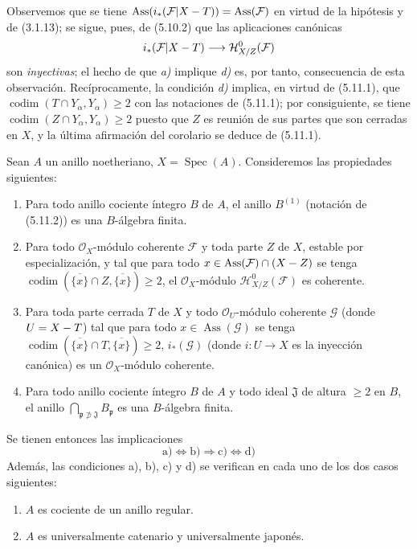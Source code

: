 Observemos que se tiene
$\operatorname{Ass}(i_*(\mathcal F\vert X- T))=\operatorname{Ass}(\mathcal F)$
en virtud de la hipótesis y de (3.1.13); se sigue, pues, de (5.10.2) que las
aplicaciones canónicas
\[
i_*(\mathcal F\vert X- T)\longrightarrow\mathcal H^0_{X/Z}(\mathcal F)
\]
son \emph{inyectivas}; el hecho de que \emph{a)} implique \emph{d)} es, por tanto, consecuencia de
esta observación. Recíprocamente, la condición \emph{d)} implica, en virtud de
(5.11.1), que $\operatorname{codim}(T\cap Y_\alpha,Y_\alpha)\geq2$ con las
notaciones de (5.11.1); por consiguiente, se tiene
$\operatorname{codim}(Z\cap Y_\alpha,Y_\alpha)\geq2$ puesto que $Z$ es reunión
de sus partes que son cerradas en $X$, y la última afirmación del
corolario se deduce de (5.11.1).

\begin{corollary}[5.11.6]
\label{IV.2.s5.11.6-fr}
Sean $A$ un anillo noetheriano, $X=\operatorname{Spec}(A)$. Consideremos las
propiedades siguientes:
\begin{enumerate}
\item[\textup{a)}] Para todo anillo cociente íntegro $B$ de $A$, el anillo $B^{(1)}$
\textup{(notación de (5.11.2))} es una $B$-álgebra finita.
\item[\textup{b)}] Para todo $\mathcal O_X$-módulo coherente $\mathcal F$ y toda parte
$Z$ de $X$, estable por especialización, y tal que para todo
$x\in\operatorname{Ass}(\mathcal F)\cap(X- Z)$ se tenga
$\operatorname{codim}(\overline{\{x\}}\cap Z,\overline{\{x\}})\geq2$, el
$\mathcal O_X$-módulo $\mathcal H^0_{X/Z}(\mathcal F)$ es coherente.
\item[\textup{c)}] Para toda parte cerrada $T$ de $X$ y todo $\mathcal O_U$-módulo
coherente $\mathcal G$ (donde $U=X- T$) tal que para todo
$x\in\operatorname{Ass}(\mathcal G)$ se tenga
$\operatorname{codim}(\overline{\{x\}}\cap T,\overline{\{x\}})\geq2$,
$i_*(\mathcal G)$ (donde $i:U\to X$ es la inyección canónica) es un
$\mathcal O_X$-módulo coherente.
\item[\textup{d)}] Para todo anillo cociente íntegro $B$ de $A$ y todo ideal
$\mathfrak J$ de altura $\geq2$ en $B$, el anillo
$\bigcap_{\mathfrak p\not\supset\mathfrak J}B_\mathfrak p$
es una $B$-álgebra finita.
\end{enumerate}
Se tienen entonces las implicaciones
\[
\mathrm a)\Longleftrightarrow\mathrm b)\Longrightarrow\mathrm c)
\Longleftrightarrow\mathrm d)
\]
Además, las condiciones \textup{a), b), c)} y \textup{d)} se verifican en cada uno de los dos
casos siguientes:
\begin{enumerate}
\item[\textup{(i)}] $A$ es cociente de un anillo regular.
\item[\textup{(ii)}] $A$ es universalmente catenario y universalmente japonés.
\end{enumerate}
\end{corollary}

